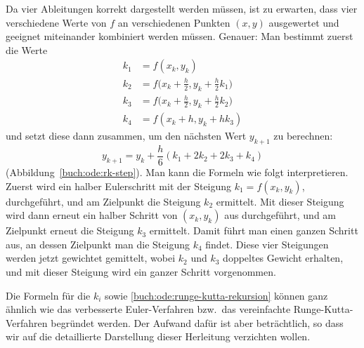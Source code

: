 Da vier Ableitungen korrekt dargestellt werden müssen, ist zu erwarten,
dass vier verschiedene Werte von $f$ an verschiedenen Punkten $(x,y)$
ausgewertet und geeignet miteinander kombiniert werden müssen.
Genauer: Man bestimmt zuerst die Werte
\begin{align*}
k_1&=f(x_k,y_k)\\
k_2&=f\biggl(x_k+\frac{h}2,y_k+\frac{h}2k_1\biggr)\\
k_3&=f\biggl(x_k+\frac{h}2,y_k+\frac{h}2k_2\biggr)\\
k_4&=f(x_k+h, y_k+hk_3)
\end{align*}
und setzt diese dann zusammen, um den nächsten Wert $y_{k+1}$
zu berechnen:
\begin{equation}
y_{k+1} = y_k + \frac{h}6(k_1 + 2k_2 + 2k_3 + k_4)
\label{buch:ode:runge-kutta-rekursion}
\end{equation}
(Abbildung~\ref{buch:ode:rk-step}).
Man kann die Formeln wie folgt interpretieren.
Zuerst wird ein halber Eulerschritt mit der Steigung $k_1=f(x_k,y_k)$,
durchgeführt, und am Zielpunkt die Steigung $k_2$ ermittelt.
Mit dieser Steigung wird dann erneut ein halber Schritt von $(x_k,y_k)$
aus durchgeführt, und am Zielpunkt erneut die Steigung $k_3$ ermittelt.
Damit führt man einen ganzen Schritt aus, an dessen Zielpunkt man die
Steigung $k_4$ findet.
Diese vier Steigungen werden jetzt gewichtet gemittelt, wobei
$k_2$ und $k_3$ doppeltes Gewicht erhalten, und mit dieser
Steigung wird ein ganzer Schritt vorgenommen.

Die Formeln für die $k_i$ sowie \eqref{buch:ode:runge-kutta-rekursion}
können ganz ähnlich wie das verbesserte Euler-Verfahren bzw.~das
vereinfachte Runge-Kutta-Verfahren begründet werden.
Der Aufwand dafür ist aber beträchtlich, so dass wir auf die
detaillierte Darstellung dieser Herleitung verzichten wollen.

